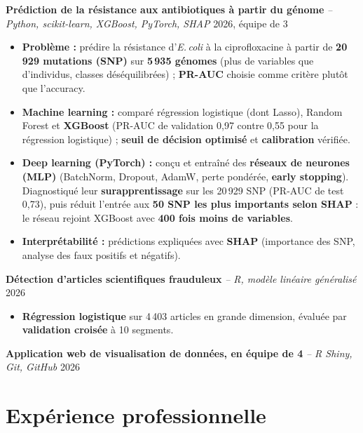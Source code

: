 \documentclass[10pt,a4paper]{article}
\newcommand{\projet}[3]{%
  {\bfseries #1} {\small\itshape\color{soft} -- #2} \hfill {\small\color{soft} #3}\par
  \vspace{1pt}%
}
\begin{document}
\projet{Prédiction de la résistance aux antibiotiques à partir du génome}{Python, scikit-learn, XGBoost, PyTorch, SHAP}{2026, équipe de 3}
\begin{itemize}
  \item \textbf{Problème :} prédire la résistance d'\textit{E.\,coli} à la ciprofloxacine à partir de \textbf{20\,929 mutations (SNP)}
        sur \textbf{5\,935 génomes} (plus de variables que d'individus, classes déséquilibrées) ; \textbf{PR-AUC} choisie comme critère plutôt que l'accuracy.
  \item \textbf{Machine learning :} comparé régression logistique (dont Lasso), Random Forest et \textbf{XGBoost} (PR-AUC de validation
        0,97 contre 0,55 pour la régression logistique) ; \textbf{seuil de décision optimisé} et \textbf{calibration} vérifiée.
  \item \textbf{Deep learning (PyTorch) :} conçu et entraîné des \textbf{réseaux de neurones (MLP)} (BatchNorm, Dropout, AdamW,
        perte pondérée, \textbf{early stopping}). Diagnostiqué leur \textbf{surapprentissage} sur les 20\,929 SNP (PR-AUC de test 0,73),
        puis réduit l'entrée aux \textbf{50 SNP les plus importants selon SHAP} : le réseau rejoint XGBoost avec \textbf{400 fois moins de variables}.
  \item \textbf{Interprétabilité :} prédictions expliquées avec \textbf{SHAP} (importance des SNP, analyse des faux positifs et négatifs).
\end{itemize}
\vspace{2pt}

\projet{Détection d'articles scientifiques frauduleux}{R, modèle linéaire généralisé}{2026}
\begin{itemize}
  \item \textbf{Régression logistique} sur 4\,403 articles en grande dimension, évaluée par \textbf{validation croisée} à 10 segments.
\end{itemize}
\vspace{2pt}

\projet{Application web de visualisation de données, en équipe de 4}{R Shiny, Git, GitHub}{2026}

\section{Expérience professionnelle}
\end{document}
